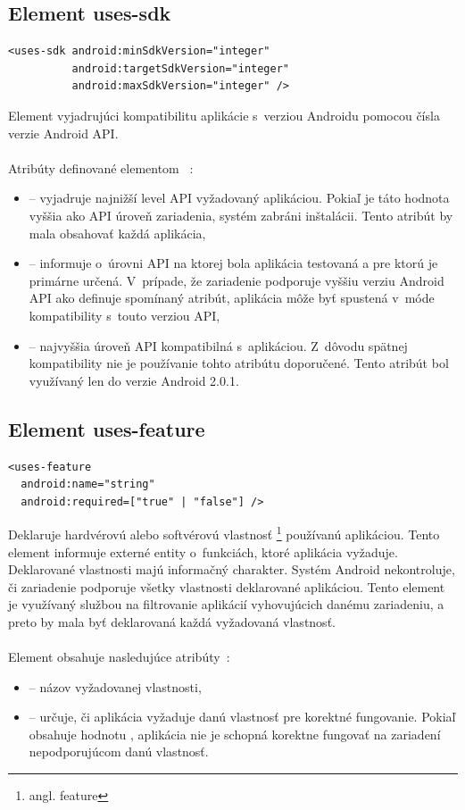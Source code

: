 \subsection{Element uses-sdk}
\lstset{language=XML}
\begin{lstlisting}
<uses-sdk android:minSdkVersion="integer"
          android:targetSdkVersion="integer"
          android:maxSdkVersion="integer" />
\end{lstlisting}
Element vyjadrujúci kompatibilitu aplikácie s~verziou Androidu pomocou čísla verzie Android API.\\\\
Atribúty definované elementom ~\cite{elUsesSdk}:\\
\begin{itemize}
\item {} -- vyjadruje najnižší level API vyžadovaný aplikáciou. Pokiaľ je táto hodnota vyššia ako API úroveň zariadenia, systém zabráni inštalácii. Tento atribút by mala obsahovať každá aplikácia,
\item {} -- informuje o~úrovni API na ktorej bola aplikácia testovaná a pre ktorú je primárne určená. V~prípade, že zariadenie podporuje vyššiu verziu Android API ako definuje spomínaný atribút, aplikácia môže byť spustená v~móde kompatibility s~touto verziou API,
\item {} -- najvyššia úroveň API kompatibilná s~aplikáciou. Z~dôvodu spätnej kompatibility nie je používanie tohto atribútu doporučené. Tento atribút bol využívaný len do verzie Android 2.0.1.
\end{itemize}

\subsection{Element uses-feature}
\label{el_uses-feature}
\lstset{language=XML}
\begin{lstlisting}
<uses-feature
  android:name="string"
  android:required=["true" | "false"] />
\end{lstlisting}
Deklaruje hardvérovú alebo softvérovú vlastnosť \footnote{angl. feature} používanú aplikáciou. Tento element informuje externé entity o~funkciách, ktoré aplikácia vyžaduje. Deklarované vlastnosti majú informačný charakter. Systém Android nekontroluje, či zariadenie podporuje všetky vlastnosti deklarované aplikáciou. Tento element je využívaný službou  na  filtrovanie aplikácií vyhovujúcich danému zariadeniu, a preto by mala byť deklarovaná každá vyžadovaná vlastnosť.\\\\ Element obsahuje nasledujúce atribúty~\cite{elUsesFeature}:\\
\begin{itemize}
\item {} -- názov vyžadovanej vlastnosti,
\item {} -- určuje, či aplikácia vyžaduje danú vlastnosť pre korektné fungovanie. Pokiaľ obsahuje hodnotu , aplikácia nie je schopná korektne fungovať na zariadení nepodporujúcom danú vlastnosť.
\end{itemize}

